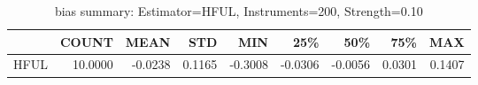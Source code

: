 \begin{table}[ht]
\centering
\caption{bias summary: Estimator=HFUL, Instruments=200, Strength=0.10}
\begin{tabular}{lrrrrrrrr}
\toprule
 & COUNT & MEAN & STD & MIN & 25\% & 50\% & 75\% & MAX \\
\midrule
HFUL & 10.0000 & -0.0238 & 0.1165 & -0.3008 & -0.0306 & -0.0056 & 0.0301 & 0.1407 \\
\bottomrule
\end{tabular}
\end{table}

